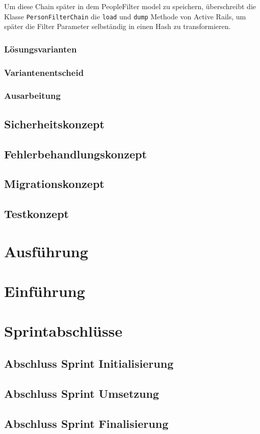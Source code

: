 Um diese Chain später in dem PeopleFilter model zu speichern, überschreibt die Klasse \texttt{Person\:\:Filter\:\:Chain} die \texttt{load} und \texttt{dump} Methode
von Active Rails, um später die Filter Parameter selbständig in einen Hash zu transformieren.

\newpage

\textbf{}

\subsection{Lösungsvarianten}
\subsection{Variantenentscheid}
\subsection{Ausarbeitung}

\section{Sicherheitskonzept}
\section{Fehlerbehandlungskonzept}
\section{Migrationskonzept}
\section{Testkonzept}

\chapter{Ausführung}



\chapter{Einführung}

\chapter{Sprintabschlüsse}

\section{Abschluss Sprint Initialisierung}

\section{Abschluss Sprint Umsetzung}

\section{Abschluss Sprint Finalisierung}


